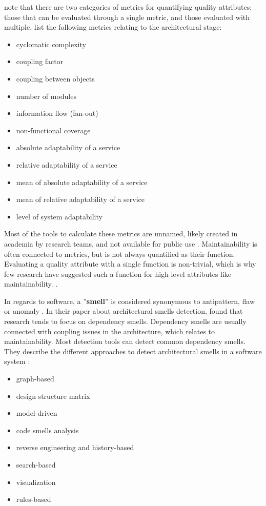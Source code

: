 \documentclass[utf8,english]{gradu3}
\begin{document}
\textcite[63]{Arvanitou2017} note that there are two categories of metrics for
quantifying quality attributes: those that can be evaluated through a single
metric, and those evaluated with multiple. \textcite[66]{Arvanitou2017} list the
following metrics relating to the architectural stage:
\begin{itemize}
  \item cyclomatic complexity
  \item coupling factor
  \item coupling between objects
  \item number of modules
  \item information flow (fan-out)
  \item non-functional coverage
  \item absolute adaptability of a service
  \item relative adaptability of a service
  \item mean of absolute adaptability of a service
  \item mean of relative adaptability of a service
  \item level of system adaptability
\end{itemize}

Most of the tools to calculate these metrics are unnamed, likely created in
academia by research teams, and not available for public use
\parencite{Arvanitou2017}. Maintainability is often connected to metrics, but is
not always quantified as their function. Evaluating a quality attribute with a
single function is non-trivial, which is why few research have suggested such a
function for high-level attributes like maintainability.
\parencite[67]{Arvanitou2017}.

In regards to software, a ''\textbf{smell}'' is considered synonymous to
antipattern, flaw or anomaly \parencite[1]{Mumtaz2021}. In their paper about
architectural smells detection, \textcite[20]{Mumtaz2021} found that research
tends to focus on dependency smells. Dependency smells are usually connected
with coupling issues in the architecture, which relates to maintainability. Most
detection tools can detect common dependency smells. They describe the different
approaches to detect architectural smells in a software system
\parencite[8-14]{Mumtaz2021}:
\begin{itemize}
  \item  graph-based
  \item design structure matrix
  \item model-driven
  \item code smells analysis
  \item reverse engineering and history-based
  \item search-based
  \item visualization
  \item rules-based
\end{itemize}
\end{document}

